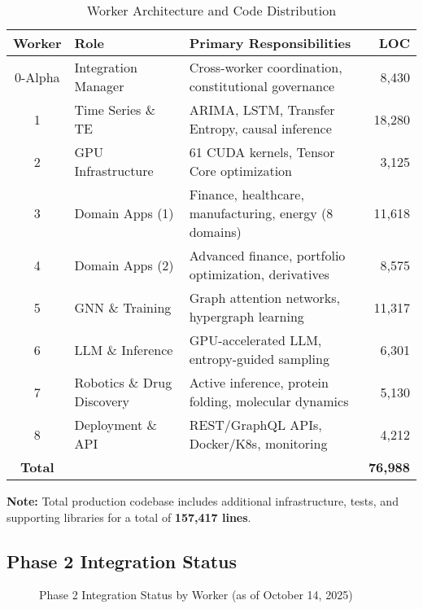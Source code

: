 \documentclass[11pt,letterpaper]{article}
\begin{document}
\begin{table}[H]
\centering
\begin{tabularx}{\textwidth}{clXr}
\toprule
\textbf{Worker} & \textbf{Role} & \textbf{Primary Responsibilities} & \textbf{LOC} \\
\midrule
0-Alpha & Integration Manager & Cross-worker coordination, constitutional governance & 8,430 \\
1 & Time Series \& TE & ARIMA, LSTM, Transfer Entropy, causal inference & 18,280 \\
2 & GPU Infrastructure & 61 CUDA kernels, Tensor Core optimization & 3,125 \\
3 & Domain Apps (1) & Finance, healthcare, manufacturing, energy (8 domains) & 11,618 \\
4 & Domain Apps (2) & Advanced finance, portfolio optimization, derivatives & 8,575 \\
5 & GNN \& Training & Graph attention networks, hypergraph learning & 11,317 \\
6 & LLM \& Inference & GPU-accelerated LLM, entropy-guided sampling & 6,301 \\
7 & Robotics \& Drug Discovery & Active inference, protein folding, molecular dynamics & 5,130 \\
8 & Deployment \& API & REST/GraphQL APIs, Docker/K8s, monitoring & 4,212 \\
\midrule
\textbf{Total} & & & \textbf{76,988} \\
\bottomrule
\end{tabularx}
\caption{Worker Architecture and Code Distribution}
\end{table}

\textbf{Note:} Total production codebase includes additional infrastructure, tests, and supporting libraries for a total of \textbf{157,417 lines}.

\subsection{Phase 2 Integration Status}

\begin{figure}[H]
\centering
{}
\caption{Phase 2 Integration Status by Worker (as of October 14, 2025)}
\end{figure}
\end{document}
